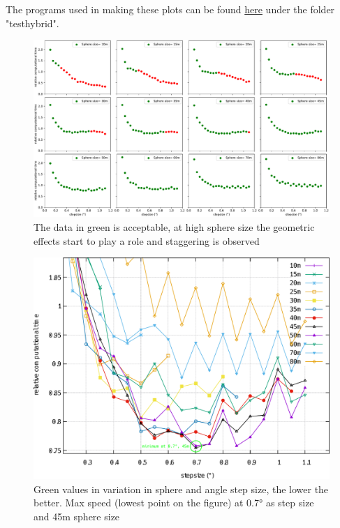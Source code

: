 The programs used in making these plots can be found \href{https://github.com/arthuradriaens-code/projects-mt}{here}
under the folder "testhybrid".
\begin{figure}
\includegraphics[width=\textwidth]{figures/subplotofallstepsphere.pdf}
\caption{The data in green is acceptable, at high sphere size the geometric effects start to play a role and staggering is observed}
\label{fig:SphereStepInfl}
\end{figure}
\begin{figure}
\includegraphics[width=\textwidth]{figures/SphereAndStepFinalWithMark.pdf}
\caption{Green values in variation in sphere and angle step size, the lower the better. Max speed (lowest point on the figure) at 0.7° as step size and 45m sphere size}
	\label{fig:SphereStepFinal}
\end{figure}
\newpage
